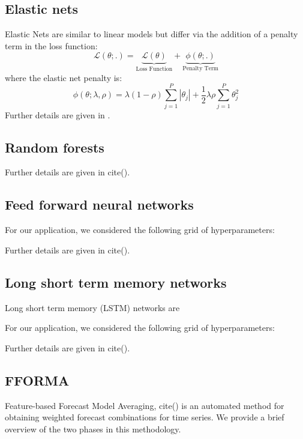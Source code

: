 \documentclass{article}
\begin{document}
\subsection{Elastic nets}
Elastic Nets are similar to linear models but differ via the addition of a penalty term in the loss function:
\begin{equation}
\mathcal{L(\theta;.)} = 
\underset{\text{Loss Function}}{\underbrace{\mathcal{L(\theta)}}} + 
\underset{\text{Penalty Term}}{\underbrace{\phi(\theta;.)}}
\end{equation}
where the elastic net penalty \cite{zou_regularization_2005} is:
\begin{equation}
\phi(\theta;\lambda,\rho) = 
\lambda(1-\rho) \sum_{j = 1}^{P}|\theta_j| +
\frac{1}{2} \lambda \rho \sum_{j = 1}^{P}\theta_j^2
\end{equation}
Further details are given in \cite{zou_regularization_2005}.

\subsection{Random forests}

Further details are given in cite().

\subsection{Feed forward neural networks}


For our application, we considered the following grid of hyperparameters:



Further details are given in cite().

\subsection{Long short term memory networks}
Long short term memory (LSTM) networks are 

For our application, we considered the following grid of hyperparameters:

Further details are given in cite().

\subsection{FFORMA}
Feature-based Forecast Model Averaging, cite() is an automated method for obtaining weighted forecast combinations for time series. We provide a brief overview of the two phases in this methodology.
\end{document}
